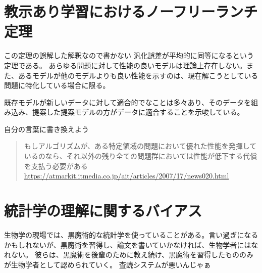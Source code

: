 \begin{comment}
\section{みにくいアヒルの子の定理}
恣意的に特徴量を選ばなければ、ある共通点をもつ２つの物に関して、類似した特徴の個数と類似しない特徴の個数は、同数になることを示唆する。

適当に取ってきた特徴によって二つの物を区別しようとすると、区別できることが多々あり、特徴をあげれるだけあげてその中から1つ選んだとすれば、$50\%$くらいは二つのことがらを区別できる特徴である。
次のような実験を計画する。まず、二つの事柄に関してあげれるだけ特徴をあげ、一つずつ特徴を取って調べて、異なっているとみなせるかを判断する。異なるといえそうなものが見つかったら、実験計画を練って、再び実験を行い、その特徴に関する仮説がすでにあったかのようにして報告を行う。
いつかは分類可能な特徴を得られるはずなので、やめておいた方が良い。研究目的を立てて、特徴となるデータを取っていくことが通常の研究方法である。

恣意的に選ばなくても、異なると判断できる特徴が見つけることができることを示唆している。
また、我々が分類を行うさいに、恣意的に特徴を選んで物を区別していることを示唆している。
\end{comment}


\section{教示あり学習におけるノーフリーランチ定理}
この定理の誤解した解釈なので書かない
汎化誤差が平均的に同等になるという定理である。
あらゆる問題に対して性能の良いモデルは理論上存在しない。また、あるモデルが他のモデルよりも良い性能を示すのは、現在解こうとしている問題に特化している場合に限る。

既存モデルが新しいデータに対して適合的でなことは多々あり、そのデータを組み込み、提案した提案モデルの方がデータに適合することを示唆している。

\fi


自分の言葉に書き換えよう
\begin{quote}
    もしアルゴリズムが、ある特定領域の問題において優れた性能を発揮しているのなら、それ以外の残り全ての問題群においては性能が低下する代償を支払う必要がある
    \url{https://atmarkit.itmedia.co.jp/ait/articles/2007/17/news020.html}    
\end{quote}
\fi 


\section{統計学の理解に関するバイアス}
生物学の現場では、黒魔術的な統計学を使っていることがある。言い過ぎになるかもしれないが、黒魔術を習得し、論文を書いていかなければ、生物学者にはなれない。
彼らは、黒魔術を後輩のために教え続け、黒魔術を習得したもののみが生物学者として認められていく。
査読システムが悪いんじゃぁ

\fi

